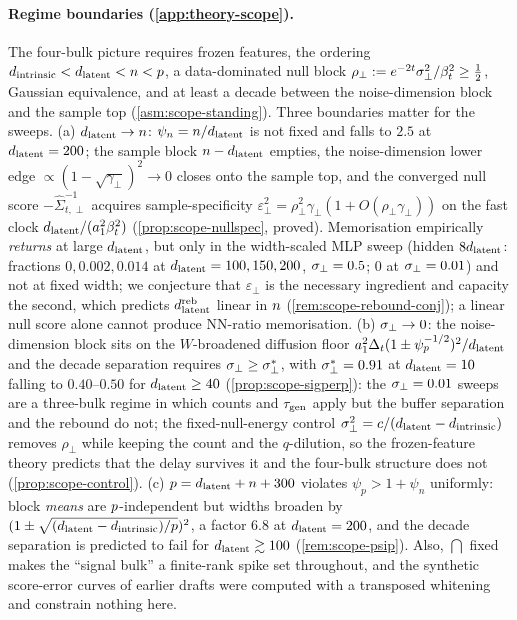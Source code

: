 \paragraph{Regime boundaries (\cref{app:theory-scope}).}
The four-bulk picture requires frozen features, the ordering $d_{\mathrm{intrinsic}}<d_{\mathrm{latent}}<n<p$, a data-dominated null block $\rho_\perp:=e^{-2t}\sigma_{\perp}^2/\beta_t^2\ge\tfrac12$, Gaussian equivalence, and at least a decade between the noise-dimension block and the sample top (\cref{asm:scope-standing}). Three boundaries matter for the sweeps. (a) $d_{\mathrm{latent}}\to n$: $\psi_n=n/d_{\mathrm{latent}}$ is not fixed and falls to $2.5$ at $d_{\mathrm{latent}}=200$; the sample block $n-d_{\mathrm{latent}}$ empties, the noise-dimension lower edge $\propto(1-\sqrt{\gamma_\perp})^2\to0$ closes onto the sample top, and the converged null score $-\hat\Sigma_{t,\perp}^{-1}$ acquires sample-specificity $\varepsilon_\perp^2=\rho_\perp^2\gamma_\perp(1+O(\rho_\perp\gamma_\perp))$ on the fast clock $d_{\mathrm{latent}}/(a_1^2\beta_t^2)$ (\cref{prop:scope-nullspec}, proved). Memorisation empirically \emph{returns} at large $d_{\mathrm{latent}}$, but only in the width-scaled MLP sweep (hidden $8d_{\mathrm{latent}}$: fractions $0,0.002,0.014$ at $d_{\mathrm{latent}}=100,150,200$, $\sigma_{\perp}=0.5$; $0$ at $\sigma_{\perp}=0.01$) and not at fixed width; we conjecture that $\varepsilon_\perp$ is the necessary ingredient and capacity the second, which predicts $d_{\mathrm{latent}}^{\rm reb}$ linear in $n$ (\cref{rem:scope-rebound-conj}); a linear null score alone cannot produce NN-ratio memorisation. (b) $\sigma_{\perp}\to0$: the noise-dimension block sits on the $W$-broadened diffusion floor $a_1^2\Delta_t(1\pm\psi_p^{-1/2})^2/d_{\mathrm{latent}}$ and the decade separation requires $\sigma_{\perp}\ge\sigma_{\perp}^*$, with $\sigma_{\perp}^*=0.91$ at $d_{\mathrm{latent}}=10$ falling to $0.40$--$0.50$ for $d_{\mathrm{latent}}\ge40$ (\cref{prop:scope-sigperp}): the $\sigma_{\perp}=0.01$ sweeps are a three-bulk regime in which counts and $\tau_{\mathrm{gen}}$ apply but the buffer separation and the rebound do not; the fixed-null-energy control $\sigma_{\perp}^2=c/(d_{\mathrm{latent}}-d_{\mathrm{intrinsic}})$ removes $\rho_\perp$ while keeping the count and the $q$-dilution, so the frozen-feature theory predicts that the delay survives it and the four-bulk structure does not (\cref{prop:scope-control}). (c) $p=d_{\mathrm{latent}}+n+300$ violates $\psi_p>1+\psi_n$ uniformly: block \emph{means} are $p$-independent but widths broaden by $(1\pm\sqrt{(d_{\mathrm{latent}}-d_{\mathrm{intrinsic}})/p})^2$, a factor $6.8$ at $d_{\mathrm{latent}}=200$, and the decade separation is predicted to fail for $d_{\mathrm{latent}}\gtrsim100$ (\cref{rem:scope-psip}). Also, $\dint$ fixed makes the ``signal bulk'' a finite-rank spike set throughout, and the synthetic score-error curves of earlier drafts were computed with a transposed whitening and constrain nothing here.


